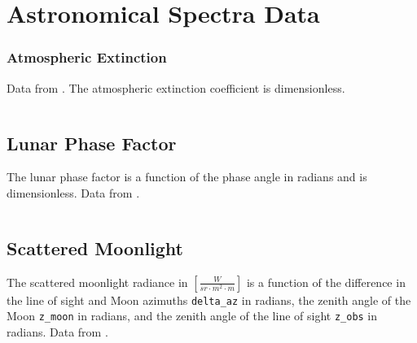 \clearpage
\section{Astronomical Spectra Data} \label{data:spectra}

\subsubsection{Atmospheric Extinction} \label{data:atm} Data from \cite{krag2003}.
The atmospheric extinction coefficient is dimensionless.
\begin{listing}[H]
\inputminted[breaklines=true, breakanywhere=true, breaksymbol=\hspace{0pt}, fontsize=\footnotesize]{json}{/Users/liamrobinson/Documents/PyLightCurves/mirage/resources/data/atmos_extinction.json}
\end{listing}


\subsection{Lunar Phase Factor}
The lunar phase factor is a function of the phase angle in radians and is dimensionless. Data from \cite{daniels1977}.
\begin{listing}[H]
\inputminted[breaklines=true, breakanywhere=true, breaksymbol=\hspace{0pt}, fontsize=\footnotesize]{json}{/Users/liamrobinson/Documents/PyLightCurves/mirage/resources/data/lunar_phase.json}
\end{listing}

\clearpage
\subsection{Scattered Moonlight}
The scattered moonlight radiance in $\left[ \frac{W}{sr \cdot m^2 \cdot m} \right]$ is a function of the difference in the line of sight and Moon azimuths \texttt{delta\_az} in radians, the zenith angle of the Moon \texttt{z\_moon} in radians, and the zenith angle of the line of sight \texttt{z\_obs} in radians. Data from \cite{daniels1977}.

